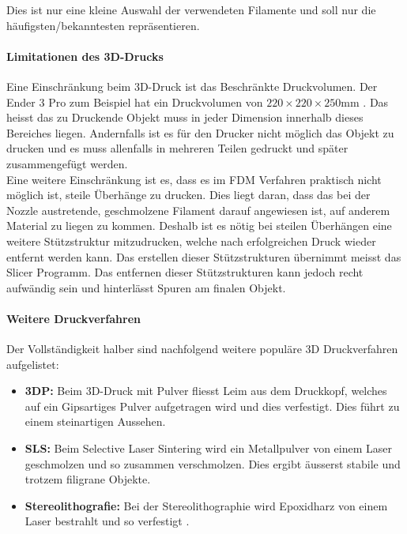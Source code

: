 Dies ist nur eine kleine Auswahl der verwendeten Filamente und soll nur die häufigsten/bekanntesten repräsentieren.


\paragraph{Limitationen des 3D-Drucks}
Eine Einschränkung beim 3D-Druck ist das Beschränkte Druckvolumen. Der Ender 3 Pro zum Beispiel hat ein Druckvolumen von $220\times 220 \times 250$mm \cite{Ender3Pro}. Das heisst das zu Druckende Objekt muss in jeder Dimension innerhalb dieses Bereiches liegen. Andernfalls ist es für den Drucker nicht möglich das Objekt zu drucken und es muss allenfalls in mehreren Teilen gedruckt und später zusammengefügt werden.\\
Eine weitere Einschränkung ist es, dass es im FDM Verfahren praktisch nicht möglich ist, steile Überhänge zu drucken. Dies liegt daran, dass das bei der Nozzle austretende, geschmolzene Filament darauf angewiesen ist, auf anderem Material zu liegen zu kommen. Deshalb ist es nötig bei steilen Überhängen eine weitere Stützstruktur mitzudrucken, welche nach erfolgreichen Druck wieder entfernt werden kann. Das erstellen dieser Stützstrukturen übernimmt meisst das Slicer Programm. Das entfernen dieser Stützstrukturen kann jedoch recht aufwändig sein und hinterlässt Spuren am finalen Objekt.

\paragraph{Weitere Druckverfahren}
Der Vollständigkeit halber sind nachfolgend weitere populäre 3D Druckverfahren aufgelistet:
\begin{itemize}
    \item \textbf{3DP:} Beim 3D-Druck mit Pulver fliesst Leim aus dem Druckkopf, welches auf ein Gipsartiges Pulver aufgetragen wird und dies verfestigt. Dies führt zu einem steinartigen Aussehen.
    \item \textbf{SLS:} Beim Selective Laser Sintering wird ein Metallpulver von einem Laser geschmolzen und so zusammen verschmolzen. Dies ergibt äusserst stabile und trotzem filigrane Objekte.
    \item \textbf{Stereolithografie:} Bei der Stereolithographie wird Epoxidharz von einem Laser bestrahlt und so verfestigt \cite{Druckverfahren}.
\end{itemize}